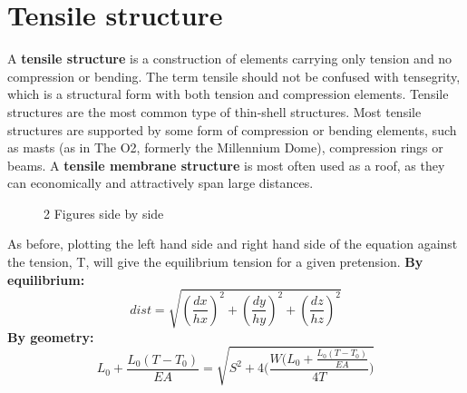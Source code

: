 \documentclass[openany,a4paper,12pt]{book}
\begin{document}
\section{Tensile structure}
A \textbf{tensile structure} is a construction of elements carrying only tension and no compression or bending. The term tensile should not be confused with tensegrity, which is a structural form with both tension and compression elements. Tensile structures are the most common type of thin-shell structures.
\newline
Most tensile structures are supported by some form of compression or bending elements, such as masts (as in The O2, formerly the Millennium Dome), compression rings or beams.
\newline \newline
A \textbf{tensile membrane structure} is most often used as a roof, as they can economically and attractively span large distances.
\begin{figure}[H]
    \centering
    \qquad
    \caption{2 Figures side by side}
\end{figure}
As before, plotting the left hand side and right hand side of the equation against the tension, T, will give the equilibrium tension for a given pretension.
\newline \newline
\textbf{By equilibrium:}
\begin{equation}
\mathit{dist} = \sqrt{\left(\dfrac{dx}{hx}\right)^2 + \left(\dfrac{dy}{hy}\right)^2 + \left(\dfrac{dz}{hz}\right)^2}
\end{equation}
\textbf{By geometry:}
\begin{equation}
L_0+\frac{L_0(T-T_0)}{EA}=\sqrt{S^2+4\bigg(\frac{W(L_0+\frac{L_0(T-T_0)}{EA}}{4T}\bigg)}
\end{equation}
\end{document}
